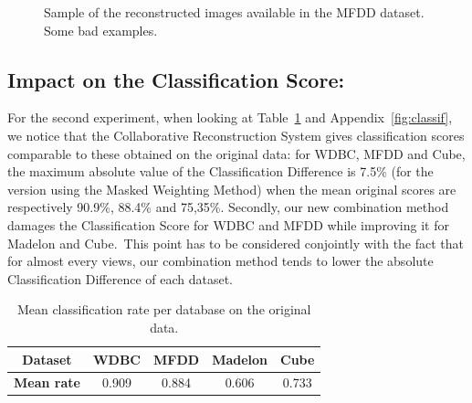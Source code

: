 \begin{figure}[h]
    \caption{Sample of the reconstructed images available in the MFDD dataset. Some bad examples.}
\label{fig:num_reconstructed_bad}
\end{figure}

    \subsection{Impact on the Classification Score:}
\label{sec:classif}

    For the second experiment, when looking at Table~\ref{table_classif} and Appendix~\ref{fig:classif}, we notice that the Collaborative Reconstruction System gives classification scores comparable to these obtained on the original data: for WDBC, MFDD and Cube, the maximum absolute value of the Classification Difference is 7.5\% (for the version using the Masked Weighting Method) when the mean original scores are respectively 90.9\%, 88.4\% and 75,35\%. Secondly, our new combination method damages the Classification Score for WDBC and MFDD while improving it for Madelon and Cube.\ This point has to be considered conjointly with the fact that for almost every views, our combination method tends to lower the absolute Classification Difference of each dataset.
	
\begin{table}[h]
    \centering
    \caption{Mean classification rate per database on the original data.}
\label{table_classif}
\begin{tabular}{ccccc}
\midrule
\textbf{Dataset}   & \parbox[c]{1.75cm}{\centering WDBC}  & \parbox[c]{1.75cm}{\centering MFDD}  & \parbox[c]{1.75cm}{\centering Madelon} & \parbox[c]{1.75cm}{\centering Cube}  \\ \midrule
\textbf{Mean rate} & 0.909 & 0.884 & 0.606   & 0.733 \\ \midrule
\end{tabular}
\end{table}

